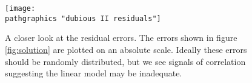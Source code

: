 \begin{figure}[t]
	\texttt{[image: \\pathgraphics "dubious II residuals"]}
	\caption{A closer look at the residual errors. The errors shown in figure \eqref{fig:solution} are plotted on an absolute scale. Ideally these errors should be randomly distributed, but we see signals of correlation suggesting the linear model may be inadequate.}
	\label{fig:dubious II residuals}
\end{figure}

\endinput  %